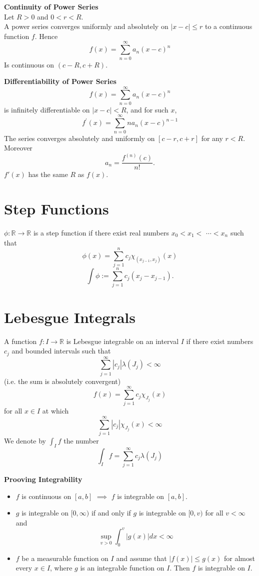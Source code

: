 \documentclass[a4paper, 10pt]{article}
\begin{document}
\begin{multicols*}{3}
\textbf{Continuity of Power Series}\\
Let $R>0$ and $0<r<R$. \\
A power series converges uniformly and absolutely on $|x-c| \leq r$ to a continuous function $f$. Hence
$$
f(x)=\sum_{n=0}^{\infty} a_n(x-c)^n
$$
Is continuous on $(c-R, c+R)$.

\textbf{Differentiability of Power Series}\\
$$
f(x)=\sum_{n=0}^{\infty} a_n(x-c)^n
$$
is infinitely differentiable on $|x-c|<R$, and for such $x$,
$$
f^{\prime}(x)=\sum_{n=0}^{\infty} n a_n(x-c)^{n-1}
$$
The series converges absolutely and uniformly on $[c-r, c+r]$ for any $r<R$. Moreover
$$
a_n=\frac{f^{(n)}(c)}{n !} .
$$
$f'(x)$ has the same $R$ as $f(x)$.


\section*{Step Functions}

$\phi: \mathbb{R} \rightarrow \mathbb{R}$ is a step function if there exist real numbers $x_0<x_1<$ $\cdots<x_n$ such that\\
$$
\phi(x)=\sum_{j=1}^n c_j \chi_{\left(x_{j-1}, x_j\right)}(x)
$$
$$
\int \phi:=\sum_{j=1}^n c_j\left(x_j-x_{j-1}\right) .
$$

\section*{Lebesgue Integrals}
A function $f: I \rightarrow \mathbb{R}$ is Lebesgue integrable on an interval $I$ if there exist numbers $c_j$ and bounded intervals such that
$$
\sum_{j=1}^{\infty}\left|c_j\right| \lambda\left(J_j\right)<\infty
$$
(i.e. the sum is absolutely convergent) 
$$
f(x)=\sum_{j=1}^{\infty} c_j \chi_{J_j}(x)
$$
for all $x \in I$ at which
$$
\sum_{j=1}^{\infty}\left|c_j\right| \chi_{J_j}(x)<\infty
$$
We denote by $\int_I f$ the number
$$
\int_I f=\sum_{j=1}^{\infty} c_j \lambda\left(J_j\right)
$$

\textbf{Prooving Integrability}
\begin{itemize}[label=\textbullet, labelsep=0.3em, leftmargin=1em]
	\item $f$ is continuous on $[a,b]$ $\implies$ $f$ is integrable on $[a,b]$.
\item $g$ is integrable on $[0, \infty)$ if and only if $g$ is integrable on $[0, v)$ for all $v<\infty$ and
$$
\sup _{v>0} \int_0^v|g(x)| d x<\infty
$$
\item $f$ be a measurable function on $I$ and assume that $|f(x)| \leq g(x)$ for almost every $x \in I$, where $g$ is an integrable function on $I$. Then $f$ is integrable on $I$.
\end{itemize}


\end{multicols*}
\end{document}
